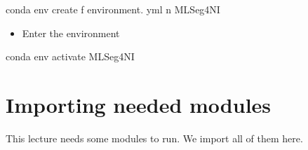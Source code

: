 \documentclass[letterpaper,10pt,english]{sphinxmanual}
\begin{document}
\begin{sphinxVerbatim}[commandchars=\\\{\}]
conda env create \PYGZhy{}f environment. yml \PYGZhy{}n MLSeg4NI
\end{sphinxVerbatim}
\begin{itemize}
\item {} 
Enter the environment

\end{itemize}

\begin{sphinxVerbatim}[commandchars=\\\{\}]
conda env activate MLSeg4NI
\end{sphinxVerbatim}


\section{Importing needed modules}
\label{\detokenize{ML4NeutronImageSegmentation:importing-needed-modules}}
This lecture needs some modules to run. We import all of them here.
\end{document}
